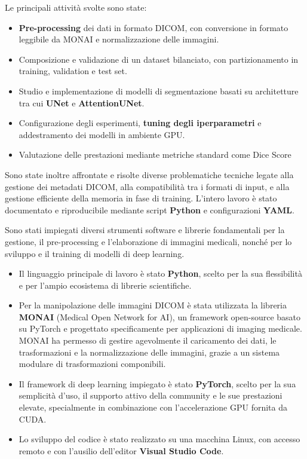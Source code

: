Le principali attività svolte sono state:
\begin{itemize}
    \item \textbf{Pre-processing} dei dati in formato DICOM, con conversione in formato leggibile da MONAI e normalizzazione delle immagini.
    \item Composizione e validazione di un dataset bilanciato, con partizionamento in training, validation e test set.
    \item Studio e implementazione di modelli di segmentazione basati su architetture tra cui \textbf{UNet} e \textbf{AttentionUNet}.
    \item Configurazione degli esperimenti, \textbf{tuning degli iperparametri} e addestramento dei modelli in ambiente GPU.
    \item Valutazione delle prestazioni mediante metriche standard come Dice Score
\end{itemize}

Sono state inoltre affrontate e risolte diverse problematiche tecniche legate alla gestione dei metadati DICOM, alla compatibilità tra i formati di input, e alla gestione efficiente della memoria in fase di training. L'intero lavoro è stato documentato e riproducibile mediante script \textbf{Python} e configurazioni \textbf{YAML}.


	
Sono stati impiegati diversi strumenti software e librerie  fondamentali per la gestione, il pre-processing e l'elaborazione di immagini medicali, nonché per lo sviluppo e il training di modelli di deep learning.
\begin{itemize}
	\item  Il linguaggio principale di lavoro è stato \textbf{Python}, scelto per la sua flessibilità e per l'ampio ecosistema di librerie scientifiche.
	\item Per la manipolazione delle immagini DICOM è stata utilizzata la libreria \textbf{MONAI} (Medical Open Network for AI), un framework open-source basato su PyTorch e progettato specificamente per applicazioni di imaging medicale. MONAI ha permesso di gestire agevolmente il caricamento dei dati, le trasformazioni e la normalizzazione delle immagini, grazie a un sistema modulare di trasformazioni componibili.
	\item Il framework di deep learning impiegato è stato \textbf{PyTorch}, scelto per la sua semplicità d'uso, il supporto attivo della community e le sue prestazioni elevate, specialmente in combinazione con l'accelerazione GPU fornita da CUDA.
	\item Lo sviluppo del codice è stato realizzato su una macchina Linux, con accesso remoto e con l'ausilio dell'editor \textbf{Visual Studio Code}.
\end{itemize}


